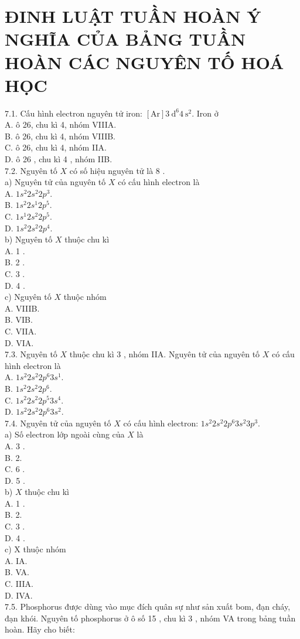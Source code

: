 \documentclass[10pt]{article}
\begin{document}
\section*{ĐINH LUẬT TUẦN HOÀN Ý NGHĨA CỦA BẢNG TUẦN HOÀN CÁC NGUYÊN TỐ HOÁ HỌC}
7.1. Cấu hình electron nguyên tử iron: $[\mathrm{Ar}] 3 \mathrm{~d}^{6} 4 \mathrm{~s}^{2}$. Iron ở\\
A. ô 26, chu kì 4, nhóm VIIIA.\\
B. ô 26, chu kì 4, nhóm VIIIB.\\
C. ô 26, chu kì 4, nhóm IIA.\\
D. ô 26 , chu kì 4 , nhóm IIB.\\
7.2. Nguyên tố $X$ có số hiệu nguyên tử là 8 .\\
a) Nguyên tử của nguyên tố $X$ có cấu hình electron là\\
A. $1 s^{2} 2 s^{2} 2 p^{3}$.\\
B. $1 s^{2} 2 s^{1} 2 p^{5}$.\\
C. $1 s^{1} 2 s^{2} 2 p^{5}$.\\
D. $1 s^{2} 2 s^{2} 2 p^{4}$.\\
b) Nguyên tố $X$ thuộc chu kì\\
A. 1 .\\
B. 2 .\\
C. 3 .\\
D. 4 .\\
c) Nguyên tố $X$ thuộc nhóm\\
A. VIIIB.\\
B. VIB.\\
C. VIIA.\\
D. VIA.\\
7.3. Nguyên tố $X$ thuộc chu kì 3 , nhóm IIA. Nguyên tử của nguyên tố $X$ có cấu hình electron là\\
A. $1 s^{2} 2 s^{2} 2 p^{6} 3 s^{1}$.\\
B. $1 s^{2} 2 s^{2} 2 p^{6}$.\\
C. $1 s^{2} 2 s^{2} 2 p^{5} 3 s^{4}$.\\
D. $1 s^{2} 2 s^{2} 2 p^{6} 3 s^{2}$.\\
7.4. Nguyên tử của nguyên tố $X$ có cấu hình electron: $1 s^{2} 2 s^{2} 2 p^{6} 3 s^{2} 3 p^{3}$.\\
a) Số electron lớp ngoài cùng của $X$ là\\
A. 3 .\\
B. 2.\\
C. 6 .\\
D. 5 .\\
b) $X$ thuộc chu kì\\
A. 1 .\\
B. 2.\\
C. 3 .\\
D. 4 .\\
c) X thuộc nhóm\\
A. IA.\\
B. VA.\\
C. IIIA.\\
D. IVA.\\
7.5. Phosphorus được dùng vào mục đích quân sự như sản xuất bom, đạn cháy, đạn khói. Nguyên tố phosphorus ở ô số 15 , chu kì 3 , nhóm VA trong bảng tuần hoàn. Hãy cho biết:
\end{document}
